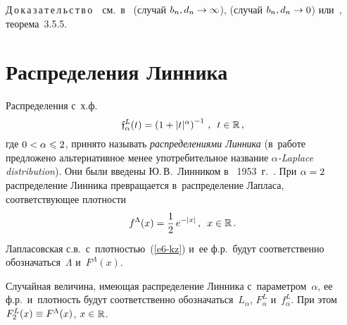\begin{multicols}{2}
\smallskip

\noindent
Д\,о\,к\,а\,з\,а\,т\,е\,л\,ь\,с\,т\,в\,о\ \  см.~в~\cite{Korolev1994} (случай
$b_n,d_n\hm\to\infty$), \cite{Korolev1995} (случай $b_n,d_n\hm\to 0$) 
или~\cite{BeningKorolev2002}, теорема~3.5.5.

\section{Распределения Линника}

Распределения с~х.ф.
$$
\mathfrak{f}^{L}_{\alpha}(t)=\left(1+|t|^{\alpha}\right)^{-1}\,,\enskip
t\in\mathbb{R}\,,
$$
где $0<\alpha\hm\leqslant2$, принято называть \textit{распределениями Линника}
(в~работе~\cite{Pillai1985} предложено альтернативное менее
употребительное название \textit{$\alpha$-Laplace distribution}). Они
были введены Ю.\,В.~Линником в~ 1953~г.~\cite{Linnik1953}. При
$\alpha\hm=2$ распределение Линника превращается в~распределение
Лапласа, соответствующее плотности
\begin{equation}
f^{\Lambda}(x)=\displaystyle\frac{\displaystyle 1\mathstrut}{\displaystyle 2\mathstrut}\,e^{-|x|}\,,\enskip
x\in\mathbb{R}\,.
\label{e6-kz}
\end{equation}
Лапласовская с.в.\ с~плот\-ностью~(\ref{e6-kz}) и~ее ф.р.\ будут соответственно
обозначаться~$\Lambda$ и~$F^{\Lambda}(x)$.

Случайная величина, имеющая распределение Линника с~параметром~$\alpha$, ее ф.р.\
и~плот\-ность будут соответственно обозначаться~$L_{\alpha}$,
$F_{\alpha}^{L}$ и~$f_{\alpha}^{L}$. При этом $F_2^{L}(x)\hm\equiv
F^{\Lambda}(x)$, $x\hm\in\mathbb{R}$.


\end{multicols}
